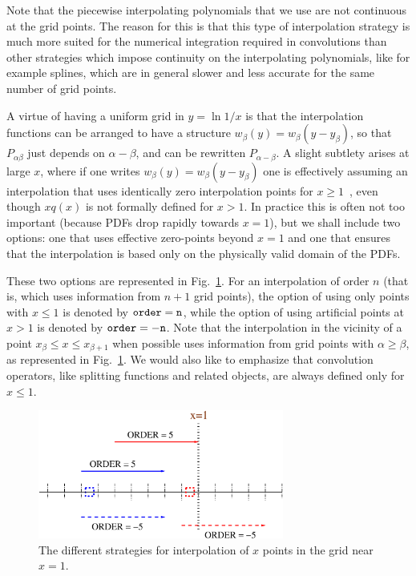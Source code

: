 \documentclass[12pt]{article}
\begin{document}
Note that the piecewise  interpolating polynomials 
that we use are not continuous at the
grid points. The reason for this is that this type of interpolation
strategy is much more suited for the numerical integration required
in convolutions than other strategies which impose continuity
on the interpolating polynomials, like for example splines, which
are in general slower and less accurate for the same number
of grid points.


A virtue
 of having a uniform grid in $y = \ln 1/x$ is that the
interpolation functions can be arranged to have a structure
$w_\beta(y) = w_{\beta}(y - y_\beta)$, so that $P_{\alpha\beta}$ just depends
on $\alpha - \beta$, and can be rewritten $P_{\alpha - \beta}$. A
slight subtlety arises at large $x$, where if one writes $w_\beta(y) =
w_{\beta}(y - y_\beta)$ one is effectively assuming an interpolation that uses
identically zero interpolation points for $x\ge 1$~\cite{coriano,
Ratcliffe:2000kp},
even though $xq(x)$ is not formally defined for $x > 1$. In practice
this is often not too important (because PDFs drop rapidly towards
$x=1$), but we shall include two options: one that uses effective
zero-points beyond $x=1$ and one that ensures that the interpolation
is based only on the physically valid domain of the PDFs.

These two options are represented in Fig.~\ref{fig:interpolation-orders}.
For an interpolation of order $n$ (that is, which uses information
from $n+1$ grid points), the option of using only points with
$x\le 1$ is denoted by $\tt order=n$, while the option
of using artificial points at $x>1$ is denoted by  
 $\tt order=-n$. Note that the interpolation in the vicinity
of a point $x_{\beta}\le x \le x_{\beta+1}$ when possible
uses information from grid points with $\alpha \ge \beta$, as represented
in Fig.~\ref{fig:interpolation-orders}. We would also
like to emphasize that convolution operators, like splitting functions
and related objects, are always defined only for $x\le 1$.

\begin{figure}
  \centering
  \includegraphics[width=0.72\textwidth]{interpolation-order.eps}%
  \caption{The different strategies for interpolation of $x$ points
in the grid near $x=1$.
  }
  \label{fig:interpolation-orders}
\end{figure}
\end{document}
